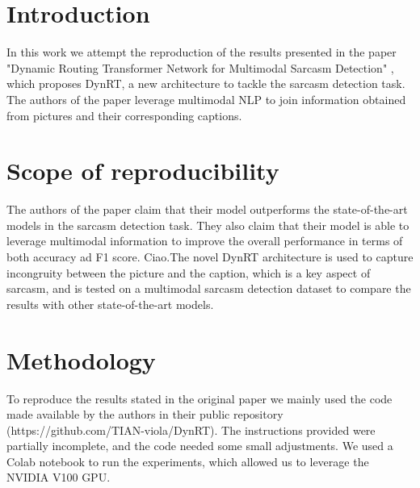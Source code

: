 \section{Introduction}
In this work we attempt the reproduction of the results presented in the paper "Dynamic Routing Transformer Network for Multimodal Sarcasm Detection" \cite{tian-etal-2023-dynamic}, which proposes DynRT, a new architecture to tackle the sarcasm detection task. The authors of the paper leverage multimodal NLP to join information obtained from pictures and their corresponding captions. 

\section{Scope of reproducibility}
\label{sec:claims}

The authors of the paper claim that their model outperforms the state-of-the-art models in the sarcasm detection task. They also claim that their model is able to leverage multimodal information to improve the overall performance in terms of both accuracy ad F1 score.
Ciao.The novel DynRT architecture is used to capture incongruity between the picture and the caption, which is a key aspect of sarcasm, and is tested on a multimodal sarcasm detection dataset to compare the results with other state-of-the-art models.
 



\section{Methodology}
To reproduce the results stated in the original paper we mainly used the code made available by the authors in their public repository (https://github.com/TIAN-viola/DynRT). The instructions provided were partially incomplete, and the code needed some small adjustments. We used a Colab notebook to run the experiments, which allowed us to leverage the NVIDIA V100 GPU.

